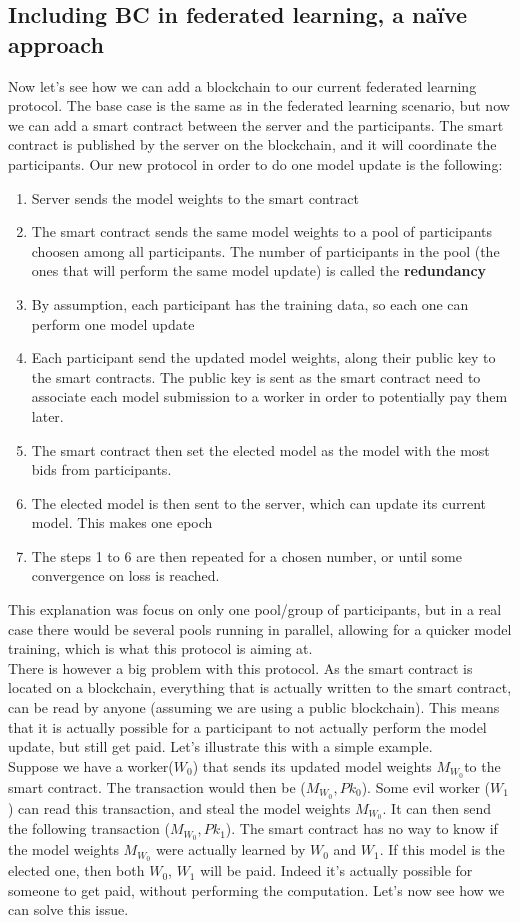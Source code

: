 \documentclass{article}
\begin{document}
\subsection{Including BC in federated learning, a naïve approach}
Now let's see how we can add a blockchain to our current federated learning protocol. The base case is the same as in
the federated learning scenario, but now we can add a smart contract between the server and the participants. The smart
contract is published by the server on the blockchain, and it will coordinate the participants. Our new protocol in
order to do one model update is the following:
\begin{enumerate}
    \item Server sends the model weights to the smart contract
    \item The smart contract sends the same model weights to a pool of participants choosen among all participants. The
number of participants in the pool (the ones that will perform the same model update) is called the \textbf{redundancy}
    \item By assumption, each participant has the training data, so each one can perform one model update
    \item Each participant send the updated model weights, along their public key to the smart contracts. The public key
is sent as the smart contract need to associate each model submission to a worker in order to potentially pay them later.
    \item The smart contract then set the elected model as the model with the most bids from participants.
    \item The elected model is then sent to the server, which can update its current model. This makes one epoch
    \item The steps 1 to 6 are then repeated for a chosen number, or until some convergence on loss is reached.
\end{enumerate}
This explanation was focus on only one pool/group of participants, but in a real case there would be several pools
running in parallel, allowing for a quicker model training, which is what this protocol is aiming at.\\
There is however a big problem with this protocol. As the smart contract is located on a blockchain, everything that is
actually written to the smart contract, can be read by anyone (assuming we are using a public blockchain). This means
that it is actually possible for a participant to not actually perform the model update, but still get paid. Let's
illustrate this with a simple example.\\
Suppose we have a worker($W_0$) that sends its updated model weights $M_{W_0}$to the smart contract. The transaction would then
be ($M_{W_0},Pk_0$). Some evil worker ($W_1$) can read this transaction, and steal the model weights $M_{W_0}$. It can then send
the following transaction ($M_{W_0}, Pk_1$). The smart contract has no way to know if the model weights $M_{W_0}$ were actually
learned by $W_0$ and $W_1$. If this model is the elected one, then both $W_0$, $W_1$ will be paid. Indeed it's actually
possible for someone to get paid, without performing the computation. Let's now see how we can solve this issue.
\end{document}
